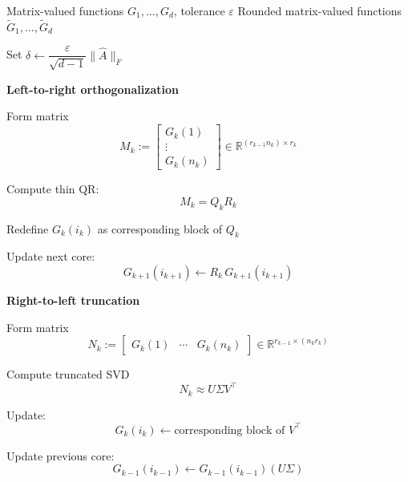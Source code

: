 \documentclass[11pt,a4paper,parskip=half-]{scrartcl}
\theoremstyle{definition}
\theoremstyle{plain}
\theoremstyle{remark}
\begin{document}
\begin{algorithm}[ht]
  \caption{TT rounding in matrix-valued function notation}
  \label{alg:rounding}
  \begin{algorithmic}[1]
    \Require Matrix-valued functions $G_1,\dots,G_d$, tolerance $\varepsilon$
    \Ensure Rounded matrix-valued functions
    $\widetilde{G}_1,\dots,\widetilde{G}_d$

    \State Set $\delta \gets \dfrac{\varepsilon}{\sqrt{d-1}} \|\widehat{A}\|_F$

    \State \textbf{Left-to-right orthogonalization}


    \State Form matrix
    \[
      M_k :=
      \begin{bmatrix}
        G_k(1) \\
        \vdots \\
        G_k(n_k)
      \end{bmatrix}
      \in
      \mathbb{R}^{(r_{k-1} n_k) \times r_k}
    \]

    \State Compute thin QR:
    \[
      M_k = Q_k R_k
    \]

    \State Redefine $G_k(i_k)$ as corresponding block of $Q_k$

    \State Update next core:
    \[
      G_{k+1}(i_{k+1})
      \leftarrow
      R_k \, G_{k+1}(i_{k+1})
    \]

    \EndFor

    \State \textbf{Right-to-left truncation}


    \State Form matrix
    \[
      N_k :=
      \begin{bmatrix}
        G_k(1) & \cdots & G_k(n_k)
      \end{bmatrix}
      \in
      \mathbb{R}^{r_{k-1} \times (n_k r_k)}
    \]

    \State Compute truncated SVD
    \[
      N_k \approx U \Sigma V^\top
    \]

    \State Update:
    \[
      G_k(i_k)
      \leftarrow
      \text{corresponding block of } V^\top
    \]

    \State Update previous core:
    \[
      G_{k-1}(i_{k-1})
      \leftarrow
      G_{k-1}(i_{k-1}) (U\Sigma)
    \]

    \EndFor

  \end{algorithmic}
\end{algorithm}
\end{document}
